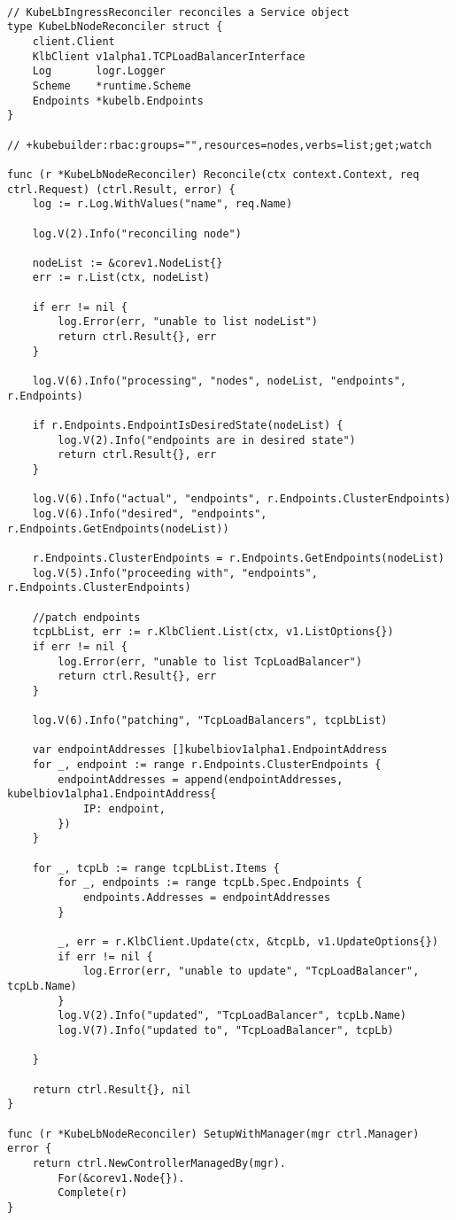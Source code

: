 \begin{lstlisting}[caption={KubeLB Agent node reconciler}, label={lst:nodecontroller-reconcile}]

// KubeLbIngressReconciler reconciles a Service object
type KubeLbNodeReconciler struct {
	client.Client
	KlbClient v1alpha1.TCPLoadBalancerInterface
	Log       logr.Logger
	Scheme    *runtime.Scheme
	Endpoints *kubelb.Endpoints
}

// +kubebuilder:rbac:groups="",resources=nodes,verbs=list;get;watch

func (r *KubeLbNodeReconciler) Reconcile(ctx context.Context, req ctrl.Request) (ctrl.Result, error) {
	log := r.Log.WithValues("name", req.Name)

	log.V(2).Info("reconciling node")

	nodeList := &corev1.NodeList{}
	err := r.List(ctx, nodeList)

	if err != nil {
		log.Error(err, "unable to list nodeList")
		return ctrl.Result{}, err
	}

	log.V(6).Info("processing", "nodes", nodeList, "endpoints", r.Endpoints)

	if r.Endpoints.EndpointIsDesiredState(nodeList) {
		log.V(2).Info("endpoints are in desired state")
		return ctrl.Result{}, err
	}

	log.V(6).Info("actual", "endpoints", r.Endpoints.ClusterEndpoints)
	log.V(6).Info("desired", "endpoints", r.Endpoints.GetEndpoints(nodeList))

	r.Endpoints.ClusterEndpoints = r.Endpoints.GetEndpoints(nodeList)
	log.V(5).Info("proceeding with", "endpoints", r.Endpoints.ClusterEndpoints)

	//patch endpoints
	tcpLbList, err := r.KlbClient.List(ctx, v1.ListOptions{})
	if err != nil {
		log.Error(err, "unable to list TcpLoadBalancer")
		return ctrl.Result{}, err
	}

	log.V(6).Info("patching", "TcpLoadBalancers", tcpLbList)

	var endpointAddresses []kubelbiov1alpha1.EndpointAddress
	for _, endpoint := range r.Endpoints.ClusterEndpoints {
		endpointAddresses = append(endpointAddresses, kubelbiov1alpha1.EndpointAddress{
			IP: endpoint,
		})
	}

	for _, tcpLb := range tcpLbList.Items {
		for _, endpoints := range tcpLb.Spec.Endpoints {
			endpoints.Addresses = endpointAddresses
		}

		_, err = r.KlbClient.Update(ctx, &tcpLb, v1.UpdateOptions{})
		if err != nil {
			log.Error(err, "unable to update", "TcpLoadBalancer", tcpLb.Name)
		}
		log.V(2).Info("updated", "TcpLoadBalancer", tcpLb.Name)
		log.V(7).Info("updated to", "TcpLoadBalancer", tcpLb)

	}

	return ctrl.Result{}, nil
}

func (r *KubeLbNodeReconciler) SetupWithManager(mgr ctrl.Manager) error {
	return ctrl.NewControllerManagedBy(mgr).
		For(&corev1.Node{}).
		Complete(r)
}

\end{lstlisting}


